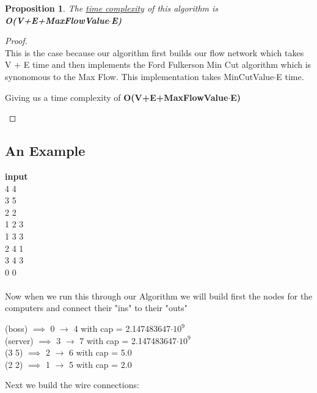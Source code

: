 \documentclass[12pt]{article}
\newtheorem{proposition}[theorem]{Proposition}
\begin{document}
\begin{proposition}
\label{numq}
The \underline{time complexity} of this algorithm is \textbf{O(V+E+MaxFlowValue$\cdot$E)}
\end{proposition}

\begin{proof}
~ \\ \indent This is the case because our algorithm first builds our flow network which
takes V + E time and then implements the Ford Fulkerson Min Cut algorithm which
is synonomous to the Max Flow. This implementation takes MinCutValue$\cdot$E time.
\begin{center}
    Giving us a time complexity of \textbf{O(V+E+MaxFlowValue$\cdot$E)}
\end{center}
\end{proof}


\subsection{An Example}
\textbf{input} \\
4 4   \\
3 5   \\
2 2   \\
1 2 3 \\
1 3 3 \\
2 4 1 \\
3 4 3 \\
0 0   \\
\\
Now when we run this through our Algorithm we will build first the nodes for the
computers and connect their "ins" to their "outs"
\begin{center}
(boss) $\implies$ 0 $\rightarrow$ 4 with cap = 2.147483647$\cdot10^9$   \\
(server) $\implies$ 3 $\rightarrow$ 7 with cap = 2.147483647$\cdot10^9$  \\
(3 5) $\implies$ 2 $\rightarrow$ 6 with cap = 5.0   \\
(2 2) $\implies$ 1 $\rightarrow$ 5 with cap = 2.0
\end{center}

\noindent Next we build the wire connections:
\end{document}
